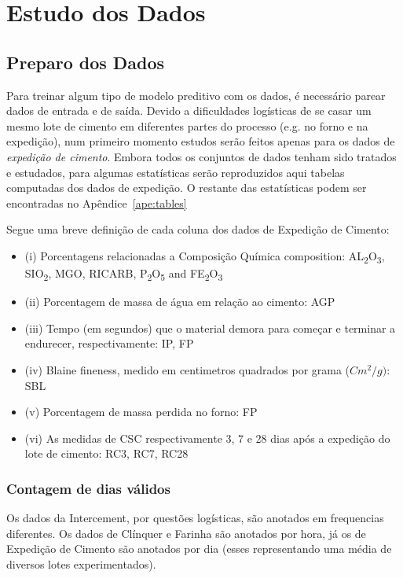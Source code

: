 \chapter{Estudo dos Dados}
\label{cap:estudodados}


\section{Preparo dos Dados}


Para treinar algum tipo de modelo preditivo com os dados, é necessário parear
dados de entrada e de saída. Devido a dificuldades logísticas de se casar um
mesmo lote de cimento em diferentes partes do processo (e.g. no forno e na
expedição), num primeiro momento estudos serão feitos apenas para os dados de
\textit{expedição de cimento}. Embora todos os conjuntos de dados tenham sido
tratados e estudados, para algumas estatísticas serão reproduzidos aqui tabelas computadas dos
dados de expedição. O restante das estatísticas podem ser encontradas no Apêndice~\ref{ape:tables}

Segue uma breve definição de cada coluna dos dados de Expedição de Cimento: \\

\begin{itemize}
\item (i) Porcentagens relacionadas a Composição Química composition: AL\textsubscript{2}O\textsubscript{3}, SIO\textsubscript{2}, MGO, RICARB, P\textsubscript{2}O\textsubscript{5} and FE\textsubscript{2}O\textsubscript{3}
\item (ii) Porcentagem de massa de água em relação ao cimento: AGP
\item (iii) Tempo (em segundos) que o material demora para começar e terminar a endurecer, respectivamente: IP, FP
\item (iv) Blaine fineness, medido em centimetros quadrados por grama ($Cm^{2}/g)$: SBL
\item (v) Porcentagem de massa perdida no forno: FP
\item (vi) As medidas de CSC respectivamente 3, 7 e 28 dias após a expedição do lote de cimento: RC3, RC7, RC28
\end{itemize}

\subsection{Contagem de dias válidos}

Os dados da Intercement, por questões logísticas, são anotados em frequencias
diferentes. Os dados de Clínquer e Farinha são anotados por hora, já os de
Expedição de Cimento são anotados por dia (esses representando uma média de
diversos lotes experimentados).

